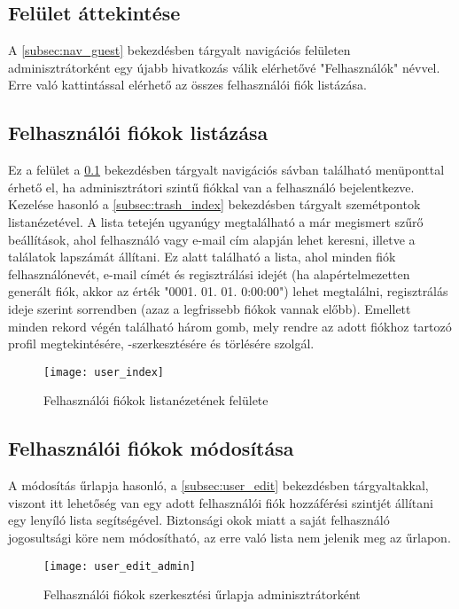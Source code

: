 \subsection{Felület áttekintése}
\label{subsec:nav_admin}

A \ref{subsec:nav_guest} bekezdésben tárgyalt navigációs felületen adminisztrátorként egy újabb hivatkozás válik elérhetővé "Felhasználók" névvel. Erre való kattintással elérhető az összes felhasználói fiók listázása.

\subsection{Felhasználói fiókok listázása}

Ez a felület a \ref{subsec:nav_admin} bekezdésben tárgyalt navigációs sávban található menüponttal érhető el, ha adminisztrátori szintű fiókkal van a felhasználó bejelentkezve. Kezelése hasonló a \ref{subsec:trash_index} bekezdésben tárgyalt szemétpontok listanézetével. A lista tetején ugyanúgy megtalálható a már megismert szűrő beállítások, ahol felhasználó vagy e-mail cím alapján lehet keresni, illetve a találatok lapszámát állítani. Ez alatt található a lista, ahol minden fiók felhasználónevét, e-mail címét és regisztrálási idejét (ha alapértelmezetten generált fiók, akkor az érték "0001. 01. 01. 0:00:00") lehet megtalálni, regisztrálás ideje szerint sorrendben (azaz a legfrissebb fiókok vannak előbb). Emellett minden rekord végén található három gomb, mely rendre az adott fiókhoz tartozó profil megtekintésére, -szerkesztésére és törlésére szolgál.

\begin{figure}[H]
	\centering
	\texttt{[image: user\_index]}
	\caption{Felhasználói fiókok listanézetének felülete}
	\label{fig:user_index}
\end{figure}

\subsection{Felhasználói fiókok módosítása}

A módosítás űrlapja hasonló, a \ref{subsec:user_edit} bekezdésben tárgyaltakkal, viszont itt lehetőség van egy adott felhasználói fiók hozzáférési szintjét állítani egy lenyíló lista segítségével. Biztonsági okok miatt a saját felhasználó jogosultsági köre nem módosítható, az erre való lista nem jelenik meg az űrlapon.

\begin{figure}[H]
	\centering
	\texttt{[image: user\_edit\_admin]}
	\caption{Felhasználói fiókok szerkesztési űrlapja adminisztrátorként}
	\label{fig:user_edit_admin}
\end{figure}

